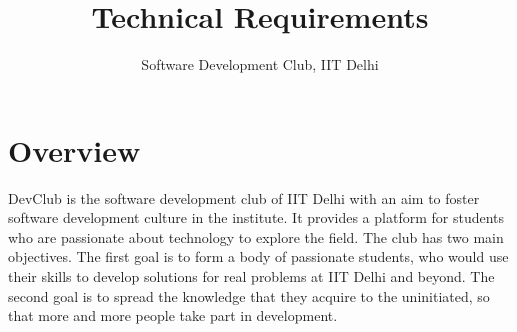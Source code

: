 \documentclass[10pt,a4paper]{article}
\title{Technical Requirements}
\author{Software Development Club, IIT Delhi}
\begin{document}
\maketitle
\section{Overview}
DevClub is the software development club of IIT Delhi with an aim to foster software development culture in the institute. It provides a platform for students who are passionate about technology to explore the field. The club has two main objectives. The first goal is to form a body of passionate students, who would use their skills to develop solutions for real problems at IIT Delhi and beyond. The second goal is to spread the knowledge that they acquire to the uninitiated, so that more and more people take part in development.
\end{document}
